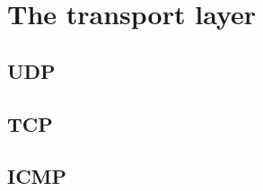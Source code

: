 \chapter{The transport layer}
\label{chap:transport-layer}

\section{UDP}
\label{sec:udp}

\section{TCP}
\label{sec:tcp}

\section{ICMP}
\label{sec:icmp}
